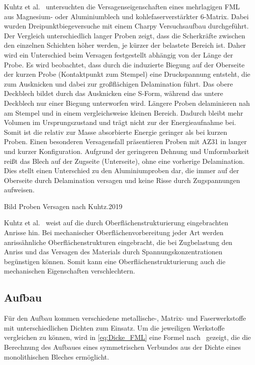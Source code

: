 Kuhtz et al.~\cite{Kuhtz2019} untersuchten die Versagenseigenschaften eines mehrlagigen FML aus Magnesium- oder Aluminiumblech und kohlefaserverstärkter 6-Matrix.
Dabei wurden Dreipunktbiegeversuche mit einem Charpy Versuchsaufbau durchgeführt.
Der Vergleich unterschiedlich langer Proben zeigt, dass die Scherkräfte zwischen den einzelnen Schichten höher werden, je kürzer der belastete Bereich ist.
Daher wird ein Unterschied beim Versagen festgestellt abhängig von der Länge der Probe.
Es wird beobachtet, dass durch die induzierte Biegung auf der Oberseite der kurzen Probe (Kontaktpunkt zum Stempel) eine Druckspannung entsteht, die zum Ausknicken und dabei zur großflächigen Delamination führt.
Das obere Deckblech bildet durch das Ausknicken eine S-Form, während das untere Deckblech nur einer Biegung unterworfen wird.
Längere Proben delaminieren nah am Stempel und in einem vergleichsweise kleinen Bereich.
Dadurch bleibt mehr Volumen im Ursprungszustand und trägt nicht zur der Energieaufnahme bei.
Somit ist die relativ zur Masse absorbierte Energie geringer als bei kurzen Proben.
Einen besonderen Versagensfall präsentieren Proben mit AZ31 in langer und kurzer Konfiguration.
Aufgrund der geringeren Dehnung und Umformbarkeit reißt das Blech auf der Zugseite (Unterseite), ohne eine vorherige Delamination.
Dies stellt einen Unterschied zu den Aluminiumproben dar, die immer auf der Oberseite durch Delamination versagen und keine Risse durch Zugspannungen aufweisen.

Bild Proben Versagen nach Kuhtz.2019

Kuhtz et al.~\cite{Kuhtz2019} weist auf die durch Oberflächenstrukturierung eingebrachten Anrisse hin.
Bei mechanischer Oberflächenvorbereitung jeder Art werden anrissähnliche Oberflächenstrukturen eingebracht, die bei Zugbelastung den Anriss und das Versagen des Materials durch Spannungskonzentrationen begünstigen können.
Somit kann eine Oberflächenstrukturierung auch die mechanischen Eigenschaften verschlechtern.

\subsection{Aufbau}\label{subsec:aufbau}

Für den Aufbau kommen verschiedene metallische-, Matrix- und Faserwerkstoffe mit unterschiedlichen Dichten zum Einsatz.
Um die jeweiligen Werkstoffe vergleichen zu können, wird in \autoref{eq:Dicke_FML} eine Formel nach~\cite{Wollmann2018} gezeigt, die die Berechnung des Aufbaues eines symmetrischen Verbundes aus der Dichte eines monolithischen Bleches ermöglicht.

